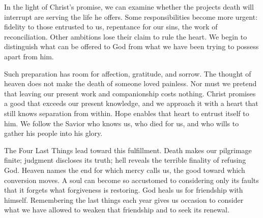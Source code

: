 In the light of Christ's promise, we can examine whether the projects death will interrupt are serving the life he offers. Some responsibilities become more urgent: fidelity to those entrusted to us, repentance for our sins, the work of reconciliation. Other ambitions lose their claim to rule the heart. We begin to distinguish what can be offered to God from what we have been trying to possess apart from him.

Such preparation has room for affection, gratitude, and sorrow. The thought of heaven does not make the death of someone loved painless. Nor must we pretend that leaving our present work and companionship costs nothing. Christ promises a good that exceeds our present knowledge, and we approach it with a heart that still knows separation from within. Hope enables that heart to entrust itself to him. We follow the Savior who knows us, who died for us, and who wills to gather his people into his glory.

The Four Last Things lead toward this fulfillment. Death makes our pilgrimage finite; judgment discloses its truth; hell reveals the terrible finality of refusing God. Heaven names the end for which mercy calls us, the good toward which conversion moves. A soul can become so accustomed to considering only its faults that it forgets what forgiveness is restoring. God heals us for friendship with himself. Remembering the last things each year gives us occasion to consider what we have allowed to weaken that friendship and to seek its renewal.

